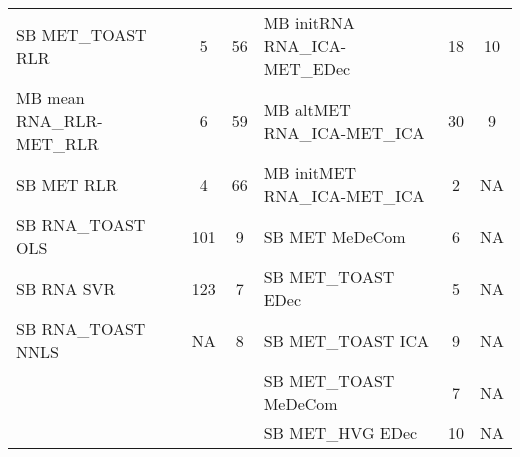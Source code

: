 \begin{table}[ht]
{\begin{tabular}{l|cc||l|cc}
SB MET\_TOAST RLR & \cellcolor[HTML]{F3F027} 5 & \cellcolor[HTML]{F58C46} 56 & MB initRNA RNA\_ICA-MET\_EDec & \cellcolor[HTML]{FBD324} 18 & \cellcolor[HTML]{F7E525} 10 \\ 
MB mean RNA\_RLR-MET\_RLR & \cellcolor[HTML]{F3EE27} 6 & \cellcolor[HTML]{F3864A} 59 & MB altMET RNA\_ICA-MET\_ICA & \cellcolor[HTML]{FEBB2B} 30 & \cellcolor[HTML]{F6E826} 9 \\ 
SB MET RLR & \cellcolor[HTML]{F2F227} 4 & \cellcolor[HTML]{EE7B51} 66 & MB initMET RNA\_ICA-MET\_ICA & \cellcolor[HTML]{F0F624} 2 & NA \\ 
SB RNA\_TOAST OLS & \cellcolor[HTML]{CB4679} 101 & \cellcolor[HTML]{F6E826} 9 & SB MET MeDeCom & \cellcolor[HTML]{F3EE27} 6 & NA \\ 
SB RNA SVR & \cellcolor[HTML]{AD2793} 123 & \cellcolor[HTML]{F5EC27} 7 & SB MET\_TOAST EDec & \cellcolor[HTML]{F3F027} 5 & NA \\ 
SB RNA\_TOAST NNLS & NA & \cellcolor[HTML]{F5E926} 8 & SB MET\_TOAST ICA & \cellcolor[HTML]{F6E826} 9 & NA \\ 
 &  &  & SB MET\_TOAST MeDeCom & \cellcolor[HTML]{F5EC27} 7 & NA \\ 
 &  &  & SB MET\_HVG EDec & \cellcolor[HTML]{F7E525} 10 & NA
\end{tabular}
}
\end{table}